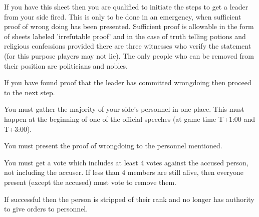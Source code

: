 \documentclass[green]{guildcamp3}
\begin{document}
	
	\name{\gYouAreFired{}}
		
	If you have this sheet then you are qualified to initiate the steps to get a leader from your side fired. This is only to be done in an emergency, when sufficient proof of wrong doing has been presented. Sufficient proof is allowable in the form of sheets labeled 'irrefutable proof' and in the case of truth telling potions and religious confessions provided there are three witnesses who verify the statement (for this purpose players may not lie). The only people who can be removed from their position are politicians and nobles.	
	
	
	\begin{enum}[Directions]
		\item If you have found proof that the leader has committed wrongdoing then proceed to the next step.
		\item You must gather the majority of your side's personnel in one place. This must happen at the beginning of one of the official speeches (at game time T+1:00 and T+3:00).
		\item You must present the proof of wrongdoing to the personnel mentioned.
		\item You must get a vote which includes at least 4 votes against the accused person, not including the accuser. If less than 4 members are still alive, then everyone present (except the accused) must vote to remove them. 
		\item If successful then the person is stripped of their rank and no longer has authority to give orders to personnel.
		
		
	\end{enum}
	
\end{document}
